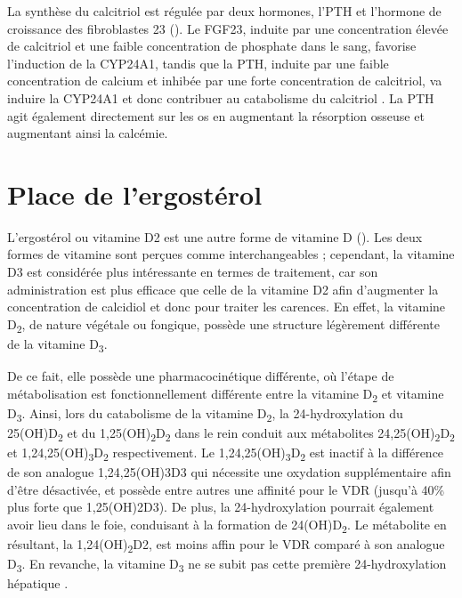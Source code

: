 \documentclass[
  a4paper,
  DIV=11,
  numbers=noendperiod,
  listof=totoc]{scrreprt}
\begin{document}
La synthèse du calcitriol est régulée par deux hormones, l'\acf{PTH} et
l'hormone de croissance des fibroblastes 23 (). Le
\ac{FGF23}, induite par une concentration élevée de calcitriol et une
faible concentration de phosphate dans le sang, favorise l'induction de
la \ac{CYP24A1}, tandis que la \ac{PTH}, induite par une faible
concentration de calcium et inhibée par une forte concentration de
calcitriol, va induire la \ac{CYP24A1} et donc contribuer au catabolisme
du calcitriol \autocite{Dankers.2017,Christakos.2010}. La \ac{PTH} agit
également directement sur les os en augmentant la résorption osseuse et
augmentant ainsi la calcémie.

\hypertarget{place-de-lergostuxe9rol}{%
\section{Place de l'ergostérol}\label{place-de-lergostuxe9rol}}

L'ergostérol ou vitamine D2 est une autre forme de vitamine D
(). Les deux formes de vitamine sont perçues comme
interchangeables ; cependant, la vitamine D3 est considérée plus
intéressante en termes de traitement, car son administration est plus
efficace que celle de la vitamine D2 afin d'augmenter la concentration
de calcidiol et donc pour traiter les carences. En effet, la vitamine
D\textsubscript{2}, de nature végétale ou fongique, possède une
structure légèrement différente de la vitamine D\textsubscript{3}.

De ce fait, elle possède une pharmacocinétique différente, où l'étape de
métabolisation est fonctionnellement différente entre la vitamine
D\textsubscript{2} et vitamine D\textsubscript{3}. Ainsi, lors du
catabolisme de la vitamine D\textsubscript{2}, la 24-hydroxylation du
25(OH)D\textsubscript{2} et du
1,25(OH)\textsubscript{2}D\textsubscript{2} dans le rein conduit aux
métabolites 24,25(OH)\textsubscript{2}D\textsubscript{2} et
1,24,25(OH)\textsubscript{3}D\textsubscript{2} respectivement. Le
1,24,25(OH)\textsubscript{3}D\textsubscript{2} est inactif à la
différence de son analogue \ac{1,24,25(OH)3D3} qui nécessite une
oxydation supplémentaire afin d'être désactivée, et possède entre autres
une affinité pour le \ac{VDR} (jusqu'à 40\% plus forte que
\ac{1,25(OH)2D3}). De plus, la 24-hydroxylation pourrait également avoir
lieu dans le foie, conduisant à la formation de
24(OH)D\textsubscript{2}. Le métabolite en résultant, la
1,24(OH)\textsubscript{2}D2, est moins affin pour le \ac{VDR} comparé à
son analogue D\textsubscript{3}. En revanche, la vitamine
D\textsubscript{3} ne se subit pas cette première 24-hydroxylation
hépatique \autocite{Houghton.2006}.
\end{document}
